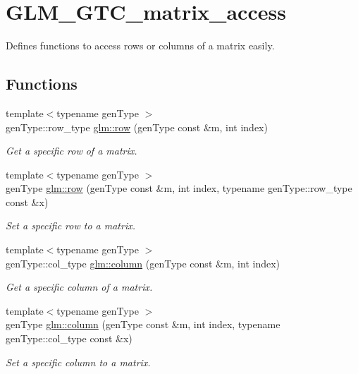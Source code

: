 \hypertarget{group__gtc__matrix__access}{\section{G\-L\-M\-\_\-\-G\-T\-C\-\_\-matrix\-\_\-access}
\label{group__gtc__matrix__access}
}


Defines functions to access rows or columns of a matrix easily.  


\subsection*{Functions}
\begin{DoxyCompactItemize}
\item 
{\footnotesize template$<$typename gen\-Type $>$ }\\gen\-Type\-::row\-\_\-type \hyperlink{group__gtc__matrix__access_ga7e90918d2599dfcce7cffdde61e0ecb4}{glm\-::row} (gen\-Type const \&m, int index)
\begin{DoxyCompactList}\small\item\em Get a specific row of a matrix. \end{DoxyCompactList}\item 
{\footnotesize template$<$typename gen\-Type $>$ }\\gen\-Type \hyperlink{group__gtc__matrix__access_ga6f90181a0a87ea6fb1beb5b90ca31ce9}{glm\-::row} (gen\-Type const \&m, int index, typename gen\-Type\-::row\-\_\-type const \&x)
\begin{DoxyCompactList}\small\item\em Set a specific row to a matrix. \end{DoxyCompactList}\item 
{\footnotesize template$<$typename gen\-Type $>$ }\\gen\-Type\-::col\-\_\-type \hyperlink{group__gtc__matrix__access_ga263133e2acfc1421ab17b41d2954aa8f}{glm\-::column} (gen\-Type const \&m, int index)
\begin{DoxyCompactList}\small\item\em Get a specific column of a matrix. \end{DoxyCompactList}\item 
{\footnotesize template$<$typename gen\-Type $>$ }\\gen\-Type \hyperlink{group__gtc__matrix__access_gae0e0157f3f2d58b640937e74d81f5ea6}{glm\-::column} (gen\-Type const \&m, int index, typename gen\-Type\-::col\-\_\-type const \&x)
\begin{DoxyCompactList}\small\item\em Set a specific column to a matrix. \end{DoxyCompactList}\end{DoxyCompactItemize}


